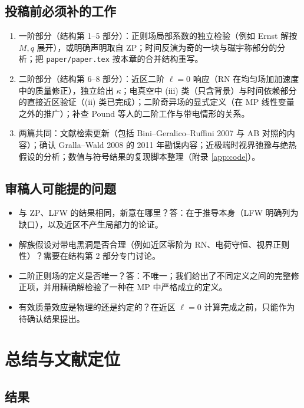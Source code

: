 \documentclass[11pt,a4paper]{ctexart}
\numberwithin{equation}{section}
\begin{document}
\subsection{投稿前必须补的工作}

\begin{enumerate}
\item 一阶部分（结构第 1--5 部分）：正则场局部系数的独立检验（例如 Ernst 解按 $M,q$ 展开），或明确声明取自 ZP；时间反演为奇的一块与磁宇称部分的分析；把 \texttt{paper/paper.tex} 按本章的合并结构重写。
\item 二阶部分（结构第 6--8 部分）：近区二阶 $\ell=0$ 响应（RN 在均匀场加加速度中的质量修正），独立给出 $\kappa$；电真空中 (iii) 类（只含背景）与时间依赖部分的直接近区验证（(ii) 类已完成）；二阶奇异场的显式定义（在 MP 线性变量之外的推广）；补查 Pound 等人的二阶工作与带电情形的关系。
\item 两篇共同：文献检索更新（包括 Bini--Geralico--Ruffini 2007 与 AB 对照的内容）；确认 Gralla--Wald 2008 的 2011 年勘误内容；近极端时视界弛豫与绝热假设的分析；数值与符号结果的复现脚本整理（附录 \ref{app:code}）。
\end{enumerate}

\subsection{审稿人可能提的问题}

\begin{itemize}
\item 与 ZP、LFW 的结果相同，新意在哪里？答：在于推导本身（LFW 明确列为缺口），以及近区不产生局部力的论证。
\item 解族假设对带电黑洞是否合理（例如近区零阶为 RN、电荷守恒、视界正则性）？需要在结构第 2 部分专门讨论。
\item 二阶正则场的定义是否唯一？答：不唯一；我们给出了不同定义之间的完整修正项，并用精确解检验了一种在 MP 中严格成立的定义。
\item 有效质量效应是物理的还是约定的？在近区 $\ell=0$ 计算完成之前，只能作为待确认结果提出。
\end{itemize}

\section{总结与文献定位}
\label{sec:summary}

\subsection{结果}
\end{document}
